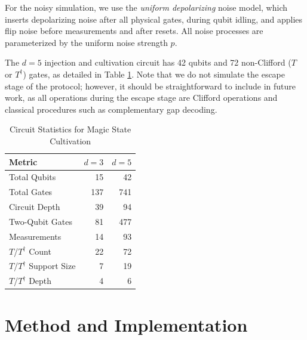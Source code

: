 \documentclass[10pt,conference]{IEEEtran}
\begin{document}
For the noisy simulation, we use the \emph{uniform depolarizing} noise model, which inserts depolarizing noise after all physical gates, during qubit idling, and applies flip noise before measurements and after resets. All noise processes are parameterized by the uniform noise strength $p$.

The $d=5$ injection and cultivation circuit has 42 qubits and 72 non-Clifford ($T$ or $T^\dagger$) gates, as detailed in Table \ref{tab2}. Note that we do not simulate the escape stage of the protocol; however, it should be straightforward to include in future work, as all operations during the escape stage are Clifford operations and classical procedures such as complementary gap decoding.


\begin{table}[ht]
    \centering
    \caption{Circuit Statistics for Magic State Cultivation}
    \label{tab2}
    \small
    \renewcommand{\arraystretch}{1.3}
    
    
    \begin{tabular}{lrr}
        \toprule
        \textbf{Metric} & \textbf{$d=3$} & \textbf{$d=5$} \\
        \midrule
        Total Qubits                         & 15       & 42       \\
        Total Gates                          & 137      & 741      \\
        Circuit Depth                        & 39       & 94       \\
        Two-Qubit Gates                      & 81       & 477      \\
        Measurements                         & 14       & 93       \\
        $T$/$T^\dagger$ Count                & 22       & 72       \\
        $T$/$T^\dagger$ Support Size         & 7        & 19       \\
        $T$/$T^\dagger$ Depth                & 4        & 6        \\
        \bottomrule
    \end{tabular}
\end{table}


\section{Method and Implementation}
\end{document}
